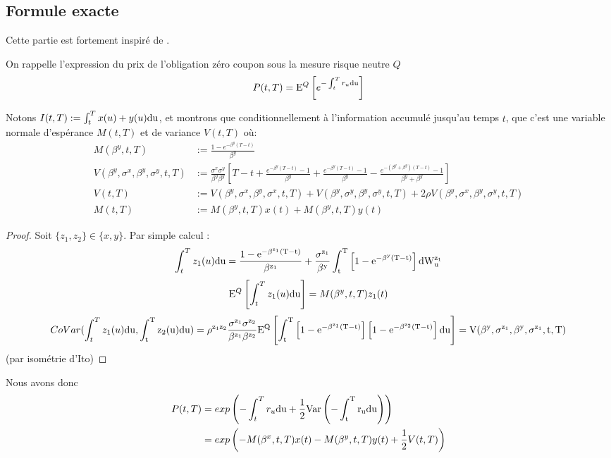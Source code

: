 \subsection{Formule exacte}
Cette partie est fortement inspiré de \cite{Brugo}.

On rappelle l'expression du prix de l'obligation zéro coupon sous la mesure risque neutre $Q$
$$P(t, T) = \mathrm{E}^Q \left[  e^{-\int_t^T r_u \rm{d}u} \right] $$

Notons $I(t, T) := \int_t^T x(u) + y(u) \rm{d}u$, et montrons que conditionnellement à l'information accumulé jusqu'au temps $t$, que c'est une variable normale d'espérance $M(t, T)$ et de variance $V(t, T)$ où:
\begin{align}
  M(\beta^y, t, T) &:= \frac{1 - e^{-\beta^y (T-t) }}{\beta^y} \\
  V(\beta^y, \sigma^x, \beta^y, \sigma^y, t, T) &:= \frac{\sigma^x \sigma^y}{\beta^y \beta^y} \left[ T - t + \frac{e^{-\beta^y (T-t) } - 1}{\beta^y} + \frac{e^{-\beta^y (T-t) } - 1}{\beta^y} - \frac{e^{-(\beta^y + \beta^y) (T-t) } - 1}{\beta^y + \beta^y} \right] \\
  V(t, T) &:= V(\beta^y, \sigma^x, \beta^y, \sigma^x, t, T)
            + V(\beta^y, \sigma^y, \beta^y, \sigma^y, t, T)
            + 2 \rho V(\beta^y, \sigma^x, \beta^y, \sigma^y, t, T) \\
            M(t, T) &:= M(\beta^y, t, T) x(t) + M(\beta^y, t, T) y(t)
\end{align}

\begin{proof}
  Soit $\{z_1, z_2\} \in \{x, y\}$.
  Par simple calcul \cite{Brugo}:
    $$  \int_t^T z_1(u) \rm{d}u = \frac{1 - e^{-\beta^{z_1} (T-t)}}{\beta^{z_1}} + \frac{\sigma^{z_1}}{\beta^y} \int_t^T \left[1 - e^{-\beta^y (T-t)}\right] \rm{d} W^{z_1}_u$$
  $$  \mathrm{E}^Q \left[ \int_t^T {z_1}(u) \rm{d}u \right] = M(\beta^y, t, T) {z_1}(t)$$
  $$ CoVar(\int_t^T {z_1}(u) \rm{d}u, \int_t^T {z_2}(u) \rm{d}u) =   \rho^{z_1 z_2} 
\frac{\sigma^{z_1} \sigma^{z_2}}{\beta^{z_1}\beta^{z_2}} \mathrm{E}^Q \left[  \int_t^T \left[1 - e^{-\beta^{z_1} (T-t)}\right] \left[1 - e^{-\beta^{z_2} (T-t)}\right] \rm{d}u  \right] = V(\beta^y, \sigma^{z_1}, \beta^y, \sigma^{z_1}, t, T)$$ (par isométrie d'Ito)
\end{proof}

Nous avons donc
\begin{align}
  P(t, T) &= exp  \left(  -\int_t^T r_u \rm{d}u + \frac{1}{2} Var \left( {-\int_t^T r_u \rm{d}u} \right)  \right) \\
          &= exp  \left( - M(\beta^x, t, T) x(t) - M(\beta^y, t, T) y(t) + \frac{1}{2} V(t, T) \right)
  \end{align}

